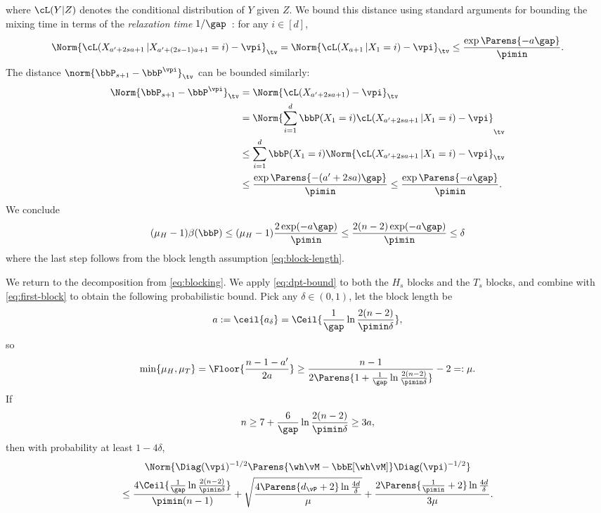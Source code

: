 where $\cL(Y|Z)$ denotes the conditional distribution of $Y$ given
$Z$.
We bound this distance using standard arguments for bounding the
mixing time in terms of the \emph{relaxation time}
$1/\gap$~\citep[see, e.g., the proof of Theorem 12.3 of][]{LePeWi08}:
for any $i \in [d]$,
\[
  \Norm{
    \cL(X_{a'+2sa+1}\,|X_{a'+(2s-1)a+1}=i)
    - \vpi
  }_{\tv}
  =
  \Norm{
    \cL(X_{a+1}\,|X_1=i)
    - \vpi
  }_{\tv}
  \leq
  \frac{
    \exp\Parens{ -a\gap }
  }{\pimin}
  .
\]
The distance $\norm{ \bbP_{s+1} - \bbP^{\vpi} }_{\tv}$ can be bounded
similarly:
\begin{align*}
  \Norm{
    \bbP_{s+1}
    - \bbP^{\vpi}
  }_{\tv}
  & =
  \Norm{
    \cL(X_{a'+2sa+1})
    - \vpi
  }_{\tv}
  \\
  & =
  \Norm{
    \sum_{i=1}^d \bbP(X_1 = i)
    \cL(X_{a'+2sa+1}\,|X_1 = i)
    - \vpi
  }_{\tv}
  \\
  & \leq
  \sum_{i=1}^d \bbP(X_1 = i)
  \Norm{
    \cL(X_{a'+2sa+1}\,|X_1 = i)
    - \vpi
  }_{\tv}
  \\
  & \leq
  \frac{
    \exp\Parens{-(a'+2sa)\gap}
  }{\pimin}
  \leq
  \frac{
    \exp\Parens{-a\gap}
  }{\pimin}
  .
\end{align*}
We conclude
\[
  (\mu_H-1)\beta(\bbP)
  \leq (\mu_H-1)\frac{2\exp(-a\gap)}{\pimin}
  \leq \frac{2(n-2)\exp(-a\gap)}{\pimin}
  \leq \delta
\]
where the last step follows from the block length assumption
\cref{eq:block-length}.

We return to the decomposition from \cref{eq:blocking}.
We apply \cref{eq:dpt-bound} to both the $H_s$ blocks and the $T_s$
blocks, and combine with \cref{eq:first-block} to obtain the following
probabilistic bound.
Pick any $\delta \in (0,1)$, let the block length be
\[
  a
  := \ceil{ a_\delta }
  =
  \Ceil{
    \frac{1}{\gap}\ln\frac{2(n-2)}{\pimin\delta}
  }
  ,
\]
so
\[
  \min\{\mu_H,\mu_T\}
  =
  \Floor{
    \frac{n-1-a'}{2a}
  }
  \geq
  \frac{n-1}
  {
    2\Parens{
      1 + \frac1{\gap}\ln\frac{2(n-2)}{\pimin\delta}
    }
  }
  -2
  =: \mu
  .
\]
If
\begin{equation}
  n \geq 7 + \frac6{\gap} \ln \frac{2(n-2)}{\pimin\delta}
  \geq 3a
  ,
  \label{eq:min-n2}
\end{equation}
then with probability at least $1-4\delta$,
\begin{multline*}
  \Norm{\Diag(\vpi)^{-1/2}\Parens{\wh\vM - \bbE[\wh\vM]} \Diag(\vpi)^{-1/2} }
  \\
  \leq
  \frac{4
    \Ceil{
      \frac{1}{\gap}\ln\frac{2(n-2)}{\pimin\delta}
    }
  }{\pimin(n-1)}
  +
  \sqrt{
    \frac{4\Parens{ d_{\vP} + 2 } \ln\frac{4d}{\delta}}
    {\mu}
  }
  + \frac{2\Parens{ \frac1{\pimin} + 2 } \ln\frac{4d}{\delta}}
  {3\mu}
  .
\end{multline*}

